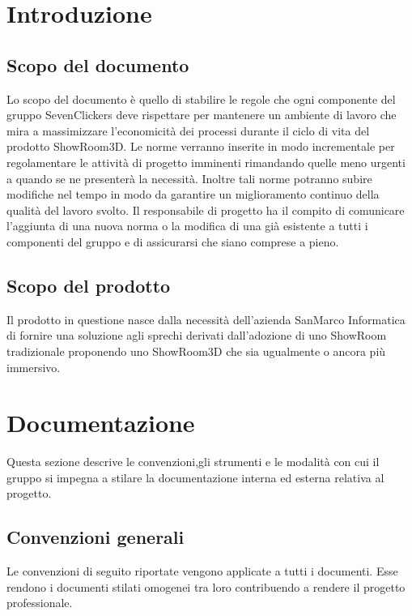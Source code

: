 \newcommand\myfontsize{\fontsize{13pt}{18pt}\selectfont}
\section{Introduzione}
\subsection{Scopo del documento}
Lo scopo del documento è quello di stabilire le regole che ogni componente del gruppo SevenClickers
deve rispettare per mantenere un ambiente di lavoro che mira a massimizzare
l'economicità dei processi durante il ciclo di vita del prodotto ShowRoom3D.
Le norme verranno inserite in modo incrementale per regolamentare le attività di progetto imminenti rimandando quelle meno urgenti a quando 
se ne presenterà la necessità.
Inoltre tali norme potranno subire modifiche nel tempo in modo da garantire un miglioramento continuo della qualità del lavoro svolto.
Il responsabile di progetto ha il compito di comunicare l'aggiunta di una nuova norma o la modifica di una già esistente a tutti i componenti
del gruppo e di assicurarsi che siano comprese a pieno.
\subsection{Scopo del prodotto}
Il prodotto in questione nasce dalla necessità dell'azienda SanMarco Informatica di fornire una soluzione agli sprechi
derivati dall'adozione di uno ShowRoom tradizionale proponendo uno ShowRoom3D che sia 
ugualmente o ancora più immersivo.


\section{Documentazione}
Questa sezione descrive le convenzioni,gli strumenti e le modalità con cui il gruppo si impegna a stilare la documentazione interna ed esterna relativa al progetto.
\subsection{Convenzioni generali}
Le convenzioni di seguito riportate vengono applicate a tutti i documenti.
Esse rendono i documenti stilati omogenei tra loro contribuendo a rendere il progetto professionale.

